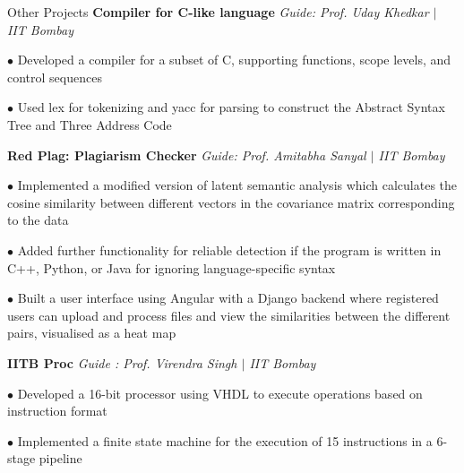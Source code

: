 \begin{rubric}{Other Projects}
    \entry*[2022] \textbf{Compiler for C-like language} \hfill \emph{Guide: Prof. Uday Khedkar $\mid$ IIT Bombay}

        $\bullet$ Developed a compiler for a subset of C, supporting functions, scope levels, and control sequences

        $\bullet$ Used lex for tokenizing and yacc for parsing to construct the Abstract Syntax Tree and Three Address Code 

    \entry*[2020] \textbf{Red Plag: Plagiarism Checker} \hfill \emph{Guide: Prof. Amitabha Sanyal $\mid$ IIT Bombay}
	    
	    $\bullet$ Implemented a modified version of latent semantic analysis which calculates the cosine similarity between different vectors in the covariance matrix corresponding to the data
        
        $\bullet$ Added further functionality for reliable detection if the program is written in C++, Python, or Java for ignoring language-specific syntax

        $\bullet$ Built a user interface using Angular with a Django backend where registered users can upload and process files and view the similarities between the different pairs, visualised as a heat map

    \entry*[2021] \textbf{IITB Proc} \hfill \emph{Guide : Prof. Virendra Singh $\mid$ IIT Bombay}
        
        $\bullet$ Developed a 16-bit processor using VHDL to execute operations based on instruction format

        $\bullet$ Implemented a finite state machine for the execution of 15 instructions in a 6-stage pipeline


        
        
\end{rubric}